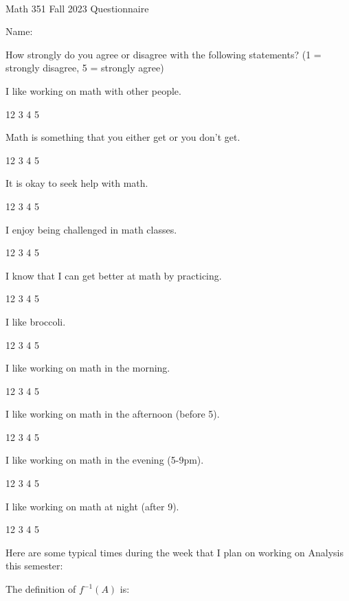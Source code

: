 \documentclass[11pt]{article}
\newcommand{\sk}{\vspace{10pt}}
\newcommand{\sm}{\vspace{3pt}}
\begin{document}
\thispagestyle{empty}
~\vspace{-.8in}~

\begin{center}
{\textsf{\LARGE Math 351 Fall 2023
 Questionnaire}}
\end{center}

Name:
\sk

How strongly do you agree or disagree with the following statements?  (1 = strongly disagree, 5 = strongly agree)
\sk


I like working on math with other people.
\sm

\centerline{1\hfill 2 \hfill 3 \hfill 4 \hfill 5} \sm

Math is something that you either get or you don't get.
\sm

\centerline{1\hfill 2 \hfill 3 \hfill 4 \hfill 5} \sm

It is okay to seek help with math.
\sm

\centerline{1\hfill 2 \hfill 3 \hfill 4 \hfill 5} \sm

I enjoy being challenged in math classes.
\sm

\centerline{1\hfill 2 \hfill 3 \hfill 4 \hfill 5} \sm

I know that I can get better at math by practicing.
\sm

\centerline{1\hfill 2 \hfill 3 \hfill 4 \hfill 5} \sm

I like broccoli. 
\sm

\centerline{1\hfill 2 \hfill 3 \hfill 4 \hfill 5} \sm

I like working on math in the morning.
\sm

\centerline{1\hfill 2 \hfill 3 \hfill 4 \hfill 5} \sm

I like working on math in the afternoon (before 5).
\sm

\centerline{1\hfill 2 \hfill 3 \hfill 4 \hfill 5} \sm

I like working on math in the evening (5-9pm).
\sm

\centerline{1\hfill 2 \hfill 3 \hfill 4 \hfill 5} \sm

I like working on math at night (after 9).
\sm

\centerline{1\hfill 2 \hfill 3 \hfill 4 \hfill 5} \sm

Here are some typical times during the week that I plan on working on Analysis this semester:


\vfill

The definition of $f^{-1}(A)$ is: 
\vspace{1in}
\end{document}
